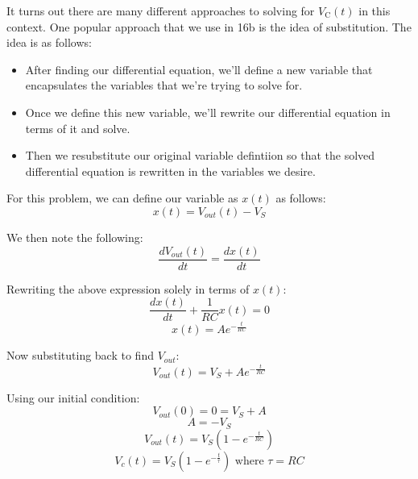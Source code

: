 \begin{enumerate}[resume]
{It turns out there are many different approaches to solving for $V_{\text{C}}(t)$ in this context.
One popular approach that we use in 16b is the idea of substitution.
The idea is as follows:
\begin{itemize}
\item After finding our differential equation, we'll define a new variable that encapsulates the variables that we're trying to solve for.
\item Once we define this new variable, we'll rewrite our differential equation in terms of it and solve.
\item Then we resubstitute our original variable defintiion so that the solved differential equation is rewritten in the variables we desire.
\end{itemize}

	For this problem, we can define our variable as $x(t)$ as follows:
	\[x(t) = V_{out}(t)-V_{S}\]

	We then note the following:
	\[\frac{dV_{out}(t)}{dt}=\frac{dx(t)}{dt}\]

	Rewriting the above expression solely in terms of $x(t)$:
	\[\frac{dx(t)}{dt}+\frac{1}{RC}x(t)=0\]
	\[x(t)=Ae^{-\frac{t}{RC}}\]

	Now substituting back to find $V_{out}$:
	\[V_{out}(t)=V_{S}+Ae^{-\frac{t}{RC}}\]

	Using our initial condition:
	\[V_{out}(0)=0=V_{S}+A\]
	\[A=-V_{S}\]
	\[V_{out}(t)=V_{S}\left(1-e^{-\frac{t}{RC}}\right)\]
	\[V_c(t) = V_S(1 - e^{-\frac{t}{\tau}}) \text{ where } \tau = RC\]
}


\end{enumerate}
